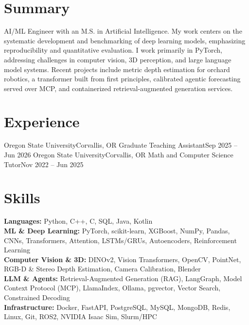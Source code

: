 \section{Summary}
\resumeSubHeadingListStart
  \item \small{AI/ML Engineer with an M.S. in Artificial Intelligence. My work centers on the systematic development and benchmarking of deep learning models, emphasizing reproducibility and quantitative evaluation. I work primarily in PyTorch, addressing challenges in computer vision, 3D perception, and large language model systems. Recent projects include metric depth estimation for orchard robotics, a transformer built from first principles, calibrated agentic forecasting served over MCP, and containerized retrieval-augmented generation services.}
\resumeSubHeadingListEnd

\section{Experience}
\resumeSubHeadingListStart
  \resumeSubheading
    {Oregon State University}{Corvallis, OR}
    {Graduate Teaching Assistant}{Sep 2025 -- Jun 2026}
    \resumeItemListStart
    \resumeItemListEnd
  \resumeSubheading
    {Oregon State University}{Corvallis, OR}
    {Math and Computer Science Tutor}{Nov 2022 -- Jun 2025}
    \resumeItemListStart
    \resumeItemListEnd
\resumeSubHeadingListEnd

\section{Skills}
\resumeSubHeadingListStart
  \item \small{
    \textbf{Languages:} Python, C++, C, SQL, Java, Kotlin \\
    \textbf{ML \& Deep Learning:} PyTorch, scikit-learn, XGBoost, NumPy, Pandas, CNNs, Transformers, Attention, LSTMs/GRUs, Autoencoders, Reinforcement Learning \\
    \textbf{Computer Vision \& 3D:} DINOv2, Vision Transformers, OpenCV, PointNet, RGB-D \& Stereo Depth Estimation, Camera Calibration, Blender \\
    \textbf{LLM \& Agents:} Retrieval-Augmented Generation (RAG), LangGraph, Model Context Protocol (MCP), LlamaIndex, Ollama, pgvector, Vector Search, Constrained Decoding \\
    \textbf{Infrastructure:} Docker, FastAPI, PostgreSQL, MySQL, MongoDB, Redis, Linux, Git, ROS2, NVIDIA Isaac Sim, Slurm/HPC
  }
\resumeSubHeadingListEnd

